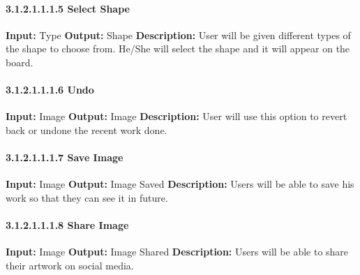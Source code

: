 \documentclass{scrreprt}
\begin{document}
\paragraph{3.1.2.1.1.1.5 Select Shape}
\hfill \vspace{2.5mm} \break 
\textbf{Input:} Type \newline
\textbf{Output:} Shape
\vspace{1mm}\newline
\textbf{Description:} \newline 
User will be given different types of the shape to choose from. He/She will select the shape and it will appear on the board.

\paragraph{3.1.2.1.1.1.6 Undo}
\hfill \vspace{2.5mm} \break 
\textbf{Input:} Image \newline
\textbf{Output:} Image
\vspace{1mm}\newline
\textbf{Description:} \newline 
User will use this option to revert back or undone the recent work done.

\paragraph{3.1.2.1.1.1.7 Save Image}
\hfill \vspace{2.5mm} \break 
\textbf{Input:} Image \newline
\textbf{Output:} Image Saved
\vspace{1mm}\newline
\textbf{Description:} \newline 
Users will be able to save his work so that they can see it in future.

\paragraph{3.1.2.1.1.1.8 Share Image}
\hfill \vspace{2.5mm} \break 
\textbf{Input:} Image \newline
\textbf{Output:} Image Shared
\vspace{1mm}\newline
\textbf{Description:} \newline 
Users will be able to share their artwork on social media.
\end{document}
